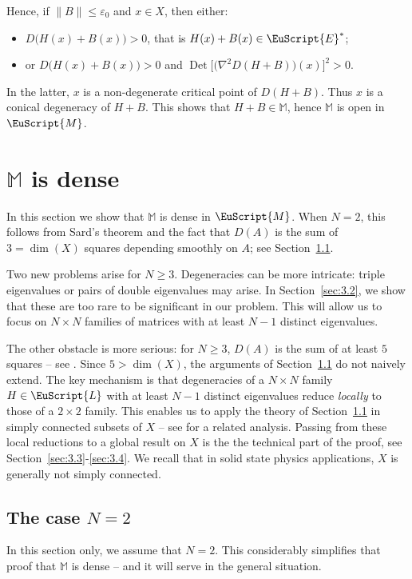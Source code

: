 \documentclass[10pt]{amsart}
\let\pazocal\EuScript
\theoremstyle{definition}
\DeclareMathOperator{\Det}{Det}
\newcommand{\EE}{\pazocal{E}}
\newcommand{\MM}{\pazocal{M}}
\newcommand{\LL}{{\pazocal{L}}}
\newcommand{\Mm}{\mathbb{M}}
\let\epsi\varepsilon
\begin{document}
Hence, if $\| B \| \leq \epsi_0$ and $x \in X$, then either:
\begin{itemize}
\item $D \bigl( H(x) + B(x)\bigr) > 0$, that is $H(x) + B(x) \in \EE^*$;
\item or $D \bigl( H(x) + B(x)\bigr) > 0$ and $\Det\bigl[ \bigl(\nabla^2 D(H+B)\bigr)(x) \bigr]^2 >0$.
\end{itemize}
In the latter, $x$ is a non-degenerate critical point of $D(H+B)$. Thus $x$ is a conical degeneracy of $H+B$. This shows that $H+B \in \Mm$, hence $\Mm$ is open in $\MM$.

\section{\texorpdfstring{$\Mm$}{M} is dense}\label{sec:3}

In this section we show that $\Mm$ is dense in $\MM$. When $N = 2$, this follows from Sard's theorem and the fact that $D(A)$ is the sum of $3=\dim(X)$ squares depending smoothly on $A$; see Section~\ref{sec:3.1}.

Two new problems arise for $N \geq 3$. Degeneracies can be more intricate: triple eigenvalues or pairs of double eigenvalues may arise. In Section~\ref{sec:3.2}, we show that these are too rare to be significant in our problem. This will allow us to focus on $N \times N$ families of matrices with at least $N-1$ distinct eigenvalues.

The other obstacle is more serious: for $N \geq 3$, $D(A)$ is the sum of at least $5$ squares -- see \cite{D11}. Since $5 > \dim(X)$, the arguments of Section~\ref{sec:3.1} do not naively extend. The key mechanism is that degeneracies of a $N \times N$ family $H \in \LL$ with at least $N-1$ distinct eigenvalues reduce \textit{locally} to those of a $2 \times 2$ family. This enables us to apply the theory of Section~\ref{sec:3.1} in simply connected subsets of $X$ -- see \cite[\S4]{DP12} for a related analysis. Passing from these local reductions to a global result on $X$ is the the technical part of the proof, see Section~\ref{sec:3.3}-\ref{sec:3.4}. We recall that in solid state physics applications, $X$ is generally not simply connected.

\subsection{The case $N=2$}\label{sec:3.1} In this section only, we assume that $N=2$. This considerably simplifies that proof that $\Mm$ is dense -- and it will serve in the general situation.
\end{document}
